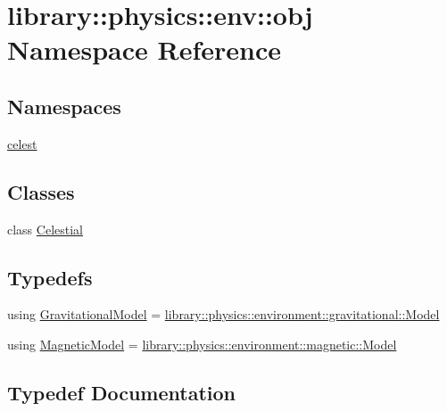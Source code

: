 \hypertarget{namespacelibrary_1_1physics_1_1env_1_1obj}{}\section{library\+:\+:physics\+:\+:env\+:\+:obj Namespace Reference}
\label{namespacelibrary_1_1physics_1_1env_1_1obj}
\subsection*{Namespaces}
\begin{DoxyCompactItemize}
\item 
 \hyperlink{namespacelibrary_1_1physics_1_1env_1_1obj_1_1celest}{celest}
\end{DoxyCompactItemize}
\subsection*{Classes}
\begin{DoxyCompactItemize}
\item 
class \hyperlink{classlibrary_1_1physics_1_1env_1_1obj_1_1_celestial}{Celestial}
\end{DoxyCompactItemize}
\subsection*{Typedefs}
\begin{DoxyCompactItemize}
\item 
using \hyperlink{namespacelibrary_1_1physics_1_1env_1_1obj_ade509c84a4970a3420c03c058ada152a}{Gravitational\+Model} = \hyperlink{classlibrary_1_1physics_1_1environment_1_1gravitational_1_1_model}{library\+::physics\+::environment\+::gravitational\+::\+Model}
\item 
using \hyperlink{namespacelibrary_1_1physics_1_1env_1_1obj_a86d4e595a77f8bd5ed03ecd32c3a80de}{Magnetic\+Model} = \hyperlink{classlibrary_1_1physics_1_1environment_1_1magnetic_1_1_model}{library\+::physics\+::environment\+::magnetic\+::\+Model}
\end{DoxyCompactItemize}


\subsection{Typedef Documentation}
\mbox{\label{namespacelibrary_1_1physics_1_1env_1_1obj_ade509c84a4970a3420c03c058ada152a}} 
